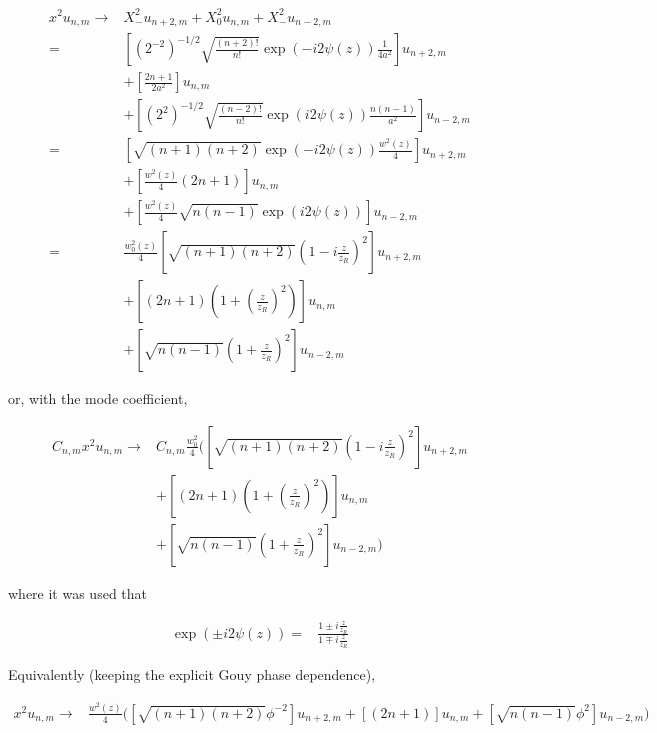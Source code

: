 \documentclass[aps,twoside,secnumarabic,balancelastpage,amsmath,amssymb,nofootinbib,hyperref=pdftex]{revtex4}
\begin{document}
\begin{align*}
x^2 u_{n, m} \rightarrow &
	X_-^2 u_{n+2,m}
	+
	X_0^2 u_{n,m}
	+
	X_-^2 u_{n-2,m}	
	\\=&
	\left[
		(2^{- 2} )^{-1/2}
		\sqrt{\frac{(n + 2)!}{n!} }
		\exp(- i2  \psi(z))
		\frac{1}{4a^2}
	\right]
	u_{n+2,m}
\\ & +
	\left[
		\frac{2n+1}{2a^2}
	\right]
		u_{n,m}
\\ & +	
	\left[
		(2^{ 2} )^{-1/2}
		\sqrt{\frac{(n - 2)!}{n!} }
		\exp( i2  \psi(z))
		\frac{n(n-1)}{a^2}
	\right]	
	u_{n-2,m}
	\\=&
			\left[
		\sqrt{(n+1)(n+2)}
		\exp(- i2  \psi(z))
		\frac{w^2(z)}{4}
	\right]
	u_{n+2,m}
\\ & +
	\left[
	\frac{w^2(z)}{4}
		(2n+1)
	\right]
		u_{n,m}
\\ & +	
	\left[
		\frac{w^2(z)}{4}
		\sqrt{n(n-1)}
		\exp( i2  \psi(z))
	\right]	
		u_{n-2,m}
\\ =&
	\frac{w_0^2 (z)}{4}
				\left[
		\sqrt{(n+1)(n+2)}
		(1-i \frac{z}{z_R})^2
	\right]
	u_{n+2,m}
\\ & +
	\left[
		(2n+1)
		(1 + (\frac{z}{z_R})^2 )
	\right]
		u_{n,m}
\\ & +	
	\left[	
		\sqrt{n(n-1)}
		(1 + \frac{z}{z_R} )^2		
	\right]	
		u_{n-2,m}
\end{align*}

or, with the mode coefficient,

\begin{align*}
	C_{n,m} x^2 u_{n,m} \rightarrow&
	C_{n,m}
	\frac{w_0^2}{4}
	\Big(
				\left[
		\sqrt{(n+1)(n+2)}
		(1-i \frac{z}{z_R})^2
	\right]
	u_{n+2,m}
\\ & +
	\left[
		(2n+1)
		(1 + (\frac{z}{z_R})^2 )
	\right]
		u_{n,m}
\\ & +	
	\left[	
		\sqrt{n(n-1)}
		(1 + \frac{z}{z_R} )^2		
	\right]	
		u_{n-2,m}
		\Big)
\end{align*}

where it was used that

\begin{align*}
	\exp(  \pm i2  \psi(z)) =&
		\frac{1 \pm i \frac{z}{z_R}  }{1 \mp i \frac{z}{z_R} }
\end{align*}

Equivalently (keeping the explicit Gouy phase dependence),

\begin{align*}
	x^2 u_{n,m} \rightarrow&
	\frac{w^2(z)}{4}
	\Big(
				\left[
		\sqrt{(n+1)(n+2)}
		\phi^{-2}
	\right]
	u_{n+2,m}
+
	\left[
		(2n+1)
	\right]
		u_{n,m}
+	
	\left[	
		\sqrt{n(n-1)}
		\phi^{2}	
	\right]	
		u_{n-2,m}
		\Big)
\end{align*}
\end{document}
